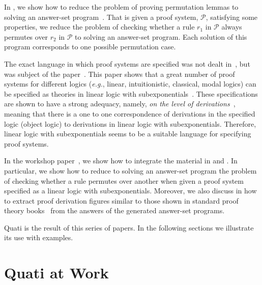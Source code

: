 \documentclass{llncs}
\newcommand\Pscr{\mathcal{P}}
\newcommand{\eg}{{\em e.g.}}
\begin{document}
In \cite{nigam13iclp}, we show how to reduce the problem of proving permutation
lemmas to solving an answer-set program~\cite{gelfond}. That is given a proof
system, $\Pscr$, satisfying some properties, we reduce the problem 
of checking whether a rule $r_1$ in $\Pscr$ always permutes over $r_2$ in
$\Pscr$ to solving an answer-set program. Each solution of this program
corresponds to one possible permutation case. 

The exact language in which proof systems are specified was not dealt
in~\cite{nigam13iclp}, but was subject of the paper~\cite{nigam.jlc}. This paper
shows that a great number of proof systems for different logics (\eg, linear,
intuitionistic, classical, modal logics) can be specified as theories in linear
logic with subexponentials~\cite{nigam09ppdp}. These specifications are shown to
have a strong adequacy, namely, \emph{on the level of
derivations}~\cite{nigam10jar}, meaning that there is a one to one
correspondence of derivations in the specified logic (object logic) to derivations in linear
logic with subexponentials. Therefore, linear logic with subexponentials seems
to be a suitable language for specifying proof systems. 

In the workshop paper~\cite{nigam14ebl}, we show how to integrate the material
in \cite{nigam13iclp} and \cite{nigam.jlc}. In particular, we show how to reduce
to solving an answer-set program the problem of checking whether a rule permutes
over another when given a proof system specified as a linear logic with
subexponentials. Moreover, we also discuss in \cite{nigam14ebl} how to extract
proof derivation figures similar to those shown in standard proof theory
books~\cite{troelstra} from the answers of the generated answer-set programs. 

Quati is the result of this series of papers. In the following sections we illustrate its use 
with examples.

% 

\section{Quati at Work}

\end{document}
